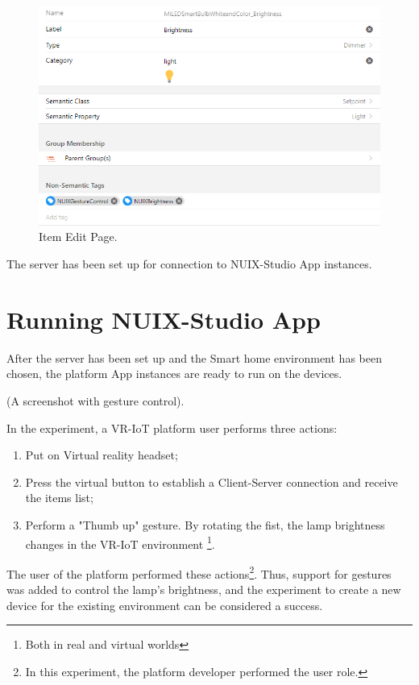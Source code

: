 \begin{figure}
  \centering
  \includegraphics[width = 0.9 \linewidth]{figures/ItemEditPage.png}
  \caption{Item Edit Page.}
  \label{fig:ItemEditPage-figure}
\end{figure}

The server has been set up for connection to NUIX-Studio App instances.

\section{Running NUIX-Studio App}

After the server has been set up and the Smart home environment has been chosen, the platform App instances are ready to run on the devices.

(A screenshot with gesture control).

In the experiment, a VR-IoT platform user performs three actions:
\begin{enumerate}
    \item Put on Virtual reality headset;
    \item Press the virtual button to establish a Client-Server connection and receive the items list;
    \item Perform a "Thumb up" gesture. By rotating the fist, the lamp brightness changes in the VR-IoT environment \footnote{Both in real and virtual worlds}.
\end{enumerate}

The user of the platform performed these actions\footnote{In this experiment, the platform developer performed the user role.}. Thus, support for gestures was added to control the lamp's brightness, and the experiment to create a new device for the existing environment can be considered a success.

